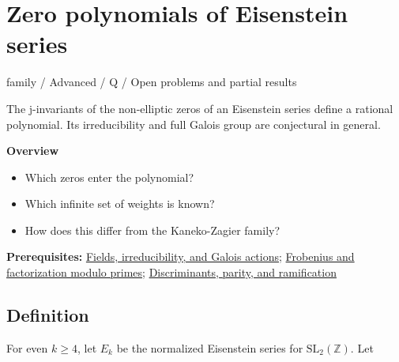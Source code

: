\documentclass[11pt,a4paper,oneside,openany]{book}
\begin{document}
\chapter{Zero polynomials of Eisenstein series}\label{article:eisenstein-zero-polynomials}\hypertarget{article:eisenstein-zero-polynomials}{}\color{black}
{\sffamily\small\color{atlasgold}family / Advanced / Q / Open problems and partial results}\par\medskip
The j-invariants of the non-elliptic zeros of an Eisenstein series define a rational polynomial. Its irreducibility and full Galois group are conjectural in general.\par\medskip
\textbf{Overview}\begin{itemize}
\item Which zeros enter the polynomial?
\item Which infinite set of weights is known?
\item How does this differ from the Kaneko-Zagier family?
\end{itemize}
{\small\textbf{Prerequisites:} \hyperlink{article:foundations}{Fields, irreducibility, and Galois actions}; \hyperlink{article:frobenius}{Frobenius and factorization modulo primes}; \hyperlink{article:discriminants}{Discriminants, parity, and ramification}}\par
{}\section{Definition}
\color{black} For even \(k\ge4\), let \(E_k\) be the normalized Eisenstein series for \(\mathrm{SL}_2(\mathbb Z)\). Let\par
\end{document}
